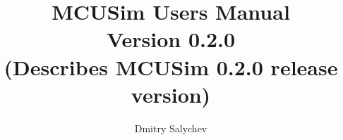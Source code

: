 \documentclass[12pt,a4paper,twoside,openright]{report}
\begin{document}
\renewcommand{\familydefault}{\sfdefault}

\title{MCUSim Users Manual \\
Version 0.2.0 \\
(Describes MCUSim 0.2.0 release version)}
\author{Dmitry Salychev}
\maketitle

\thispagestyle{empty}
\tableofcontents





\end{document}
